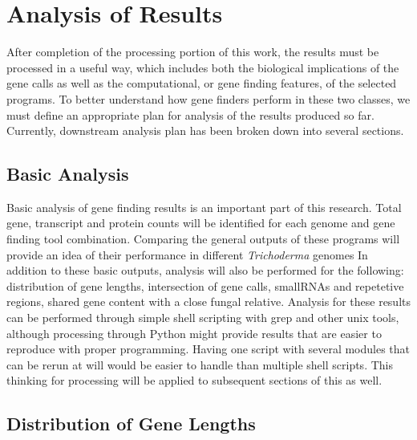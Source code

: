 \section{Analysis of Results}

After completion of the processing portion of this work, the results
must be processed in a useful way, which includes both the biological
implications of the gene calls as well as the computational, or gene
finding features, of the selected programs. To better understand
how gene finders perform in these two classes, we must define an
appropriate plan for analysis of the results produced so
far. Currently, downstream analysis plan has been broken down into
several sections.

\subsection{Basic Analysis}

Basic analysis of gene finding results is an important part of this
research. Total gene, transcript and protein counts will be identified
for each genome and gene finding tool combination. Comparing the
general outputs of these programs will provide an idea of their
performance in different \textit{Trichoderma} genomes In addition to
these basic outputs, analysis will also be performed for the
following: distribution of gene lengths, intersection of gene calls,
smallRNAs and repetetive regions, shared gene content with a close
fungal relative. Analysis for these results can be performed through
simple shell scripting with grep and other unix tools, although
processing through Python might provide results that are easier to
reproduce with proper programming. Having one script with several
modules that can be rerun at will would be easier to handle than
multiple shell scripts. This thinking for processing will be applied
to subsequent sections of this as well.

\subsection{Distribution of Gene Lengths}

